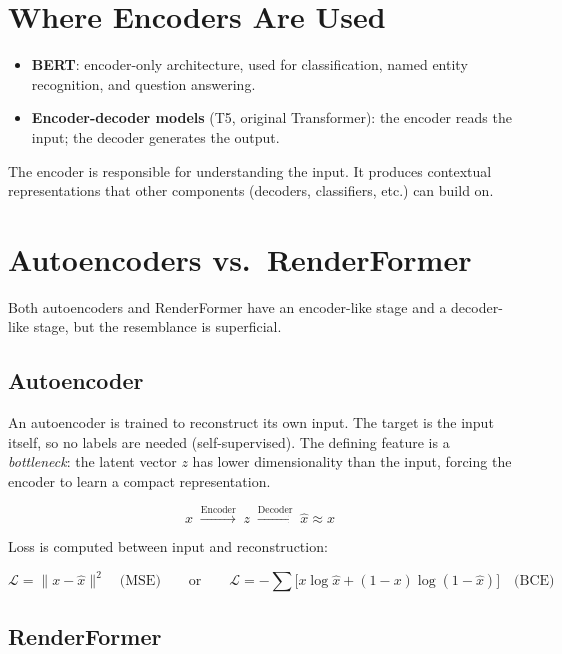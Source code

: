 \documentclass[12pt]{article}
\begin{document}
\section{Where Encoders Are Used}

\begin{itemize}
    \item \textbf{BERT}: encoder-only architecture, used for classification, named entity recognition, and question answering.
    \item \textbf{Encoder-decoder models} (T5, original Transformer): the encoder reads the input; the decoder generates the output.
\end{itemize}

The encoder is responsible for understanding the input. It produces contextual representations that other components (decoders, classifiers, etc.) can build on.

\section{Autoencoders vs.\ RenderFormer}

Both autoencoders and RenderFormer have an encoder-like stage and a decoder-like stage, but the resemblance is superficial.

\subsection{Autoencoder}

An autoencoder is trained to reconstruct its own input. The target is the input itself, so no labels are needed (self-supervised). The defining feature is a \textit{bottleneck}: the latent vector $z$ has lower dimensionality than the input, forcing the encoder to learn a compact representation.

\begin{equation}
    x \;\xrightarrow{\text{Encoder}}\; z \;\xrightarrow{\text{Decoder}}\; \hat{x} \approx x
\end{equation}

Loss is computed between input and reconstruction:

\begin{equation}
    \mathcal{L} = \|x - \hat{x}\|^2 \quad \text{(MSE)} \qquad \text{or} \qquad
    \mathcal{L} = -\sum \bigl[x \log \hat{x} + (1-x)\log(1-\hat{x})\bigr] \quad \text{(BCE)}
\end{equation}

\subsection{RenderFormer}
\end{document}

